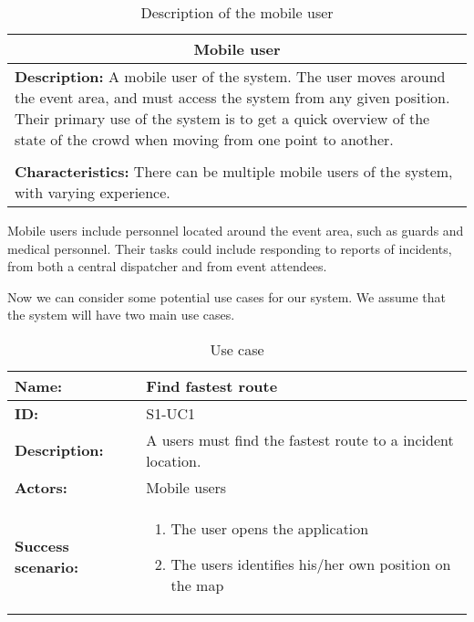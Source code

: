 \begin{table}[h!]
    \centering
    \begin{tabularx}{/8}{X}
        \toprule
        \multicolumn{1}{c}{\textbf{Mobile user}} \\ 
        \midrule
        \textbf{Description:} A mobile user of the system. The user moves around the event area, and must access the system from any given position. Their primary use of the system is to get a quick overview of the state of the crowd when moving from one point to another. \\
        \\
        \textbf{Characteristics:} There can be multiple mobile users of the system, with varying experience. \\
        \bottomrule
    \end{tabularx}
    \caption{Description of the mobile user}
    \label{tab:mob_user}
\end{table}

Mobile users include personnel located around the event area, such as guards and medical personnel. Their tasks could include responding to reports of incidents, from both a central dispatcher and from event attendees.

Now we can consider some potential use cases for our system. We assume that the system will have two main use cases. 

\begin{table}[h!]
    \centering
    \begin{tabularx}{\textwidth}{|l|X|}
        \hline
        \textbf{Name:}  & Find fastest route \\ \hline
        \textbf{ID:}    & S1-UC1 \\ \hline
        \textbf{Description:} & A users must find the fastest route to a incident location. \\ \hline
        \textbf{Actors:} & Mobile users \\ \hline
        \textbf{Success scenario:} & 
        \begin{enumerate}
            \item The user opens the application
            \item The users identifies his/her own position on the map
        \end{enumerate}
        \\
        \hline
    \end{tabularx}
    \caption{Use case}
    \label{tab:s1_uc1}
\end{table}


